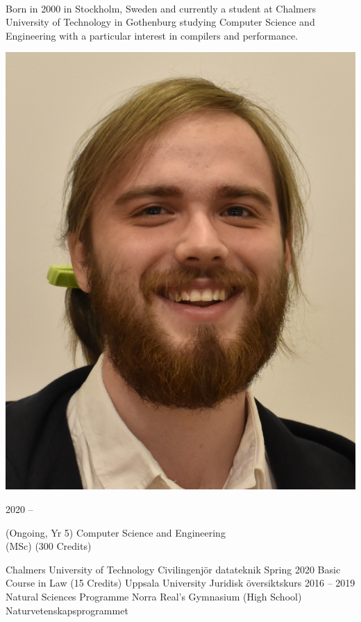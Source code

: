 \documentclass[9pt]{developercv}
\begin{document}
\begin{minipage}[t]{0.7\textwidth}
	\vspace{-\baselineskip}
	\\Born in 2000 in Stockholm, Sweden and currently a student at Chalmers
	University of Technology in Gothenburg studying Computer Science and
	Engineering with a particular interest in compilers and performance.
\end{minipage}
\hfill
\begin{minipage}[t]{0.2\textwidth}
	\vspace{-\baselineskip}
	\includegraphics[width=\linewidth]{smaller.png}
\end{minipage}
\begin{entrylist}
	\entry
		{2020 -- }
		{
			\begin{minipage}[t]{0.5\textwidth}
				(Ongoing, Yr 5) Computer Science and Engineering \\ (MSc) (300 Credits)
			\end{minipage}
		}
		{Chalmers University of Technology}
		{Civilingenjör datateknik}
	\entry
		{Spring 2020}
		{Basic Course in Law (15 Credits)}
		{Uppsala University}
		{Juridisk översiktskurs}
	\entry
		{2016 -- 2019}
		{Natural Sciences Programme}
		{Norra Real's Gymnasium (High School)}
		{Naturvetenskapsprogrammet}
\end{entrylist}
\end{document}
